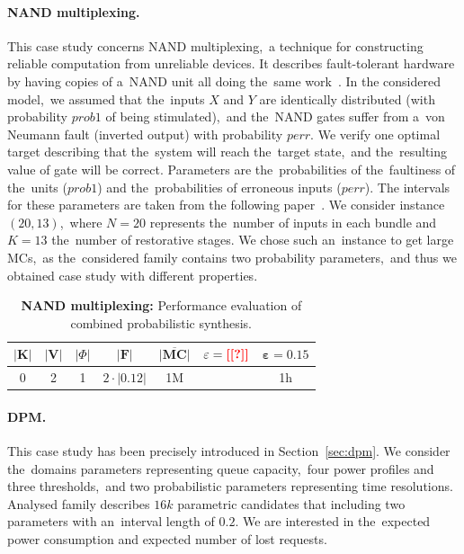 \paragraph{NAND multiplexing.}
This case study concerns NAND multiplexing,~a technique for constructing reliable computation from unreliable devices.
It describes fault-tolerant hardware by having copies of a~NAND unit all doing the~same work~\cite{nand}.
In the considered model,~we assumed that the~inputs $X$ and $Y$ are identically distributed (with probability $prob1$ of being stimulated),~and the~NAND gates suffer from a~von Neumann fault (inverted output) with probability $perr$.
We verify one optimal target describing that the~system will reach the~target state,~and the~resulting value of gate will be correct.
Parameters are the~probabilities of the~faultiness of the~units ($prob1$) and the~probabilities of erroneous inputs ($perr$).
The intervals for these parameters are taken from the following paper~\cite{nand}.
We consider instance $(20, 13)$,~where $N=20$ represents the~number of inputs in each bundle and $K=13$ the~number of restorative stages.
We chose such an~instance to get large MCs,~as the~considered family contains two probability parameters,~and thus we obtained case study with different properties.

\begin{table}[h!]
\centering
\begin{tabular}{|c|c|c|c|c|c|c|}
\hline
$\lvert \mathbf{K} \rvert$ & $\lvert \mathbf{V} \rvert$ & $\lvert \varPhi \rvert$ & $\lvert \mathcal{\mathbf{F}} \rvert$ & $\overline{\mathbf{\lvert MC \rvert}}$ & $\mathbf{\varepsilon = \textcolor{red}{\textbf{[[?]]}}}$ & $\mathbf{\varepsilon = 0.15}$ \\ \hline
0 & 2 & 1 & $2 \cdot \lvert 0.12 \rvert$ & 1M & \todo{?} & 1h \\ \hline
\end{tabular}
\caption{\textbf{NAND multiplexing:} Performance evaluation of combined probabilistic synthesis.}
\end{table}

\paragraph{DPM.}
This case study has been precisely introduced in Section~\ref{sec:dpm}.
We consider the~domains parameters representing queue capacity,~four power profiles and three thresholds,~and two probabilistic parameters representing time resolutions.
Analysed family describes $16k$ parametric candidates that including two parameters with an~interval length of $0.2$.
We are interested in the~expected power consumption and expected number of lost requests.

